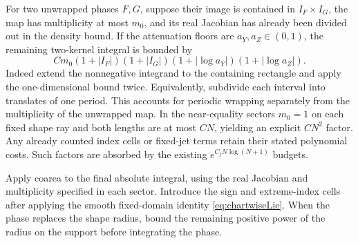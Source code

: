 \documentclass[11pt]{article}
\numberwithin{equation}{section}
\theoremstyle{definition}
\begin{document}
For two unwrapped phases \(F,G\), suppose their image is contained
in \(I_F\times I_G\), the map has multiplicity at most \(m_0\),
and its real Jacobian has already been divided out in the density
bound. If the attenuation floors are \(a_Y,a_Z\in(0,1)\), the
remaining two-kernel integral is bounded by
\[
 C m_0(1+|I_F|)(1+|I_G|)
       (1+|\log a_Y|)(1+|\log a_Z|).
\]
Indeed extend the nonnegative integrand to the containing rectangle
and apply the one-dimensional bound twice. Equivalently, subdivide
each interval into translates of one period. This accounts for
periodic wrapping separately from the multiplicity of the unwrapped
map. In the near-equality sectors \(m_0=1\) on each fixed shape
ray and both lengths are at most \(CN\), yielding an explicit
\(CN^2\) factor. Any already counted index cells or fixed-jet
terms retain their stated polynomial costs. Such factors are
absorbed by the existing \(e^{C_jN\log(N+1)}\) budgets.

Apply coarea to the final absolute integral, using the real Jacobian
and multiplicity specified in each sector. Introduce the sign and
extreme-index cells after applying the smooth fixed-domain identity
\eqref{eq:chartwiseLie}. When the phase replaces the shape radius,
bound the remaining positive power of the radius on the support
before integrating the phase.
\end{document}
